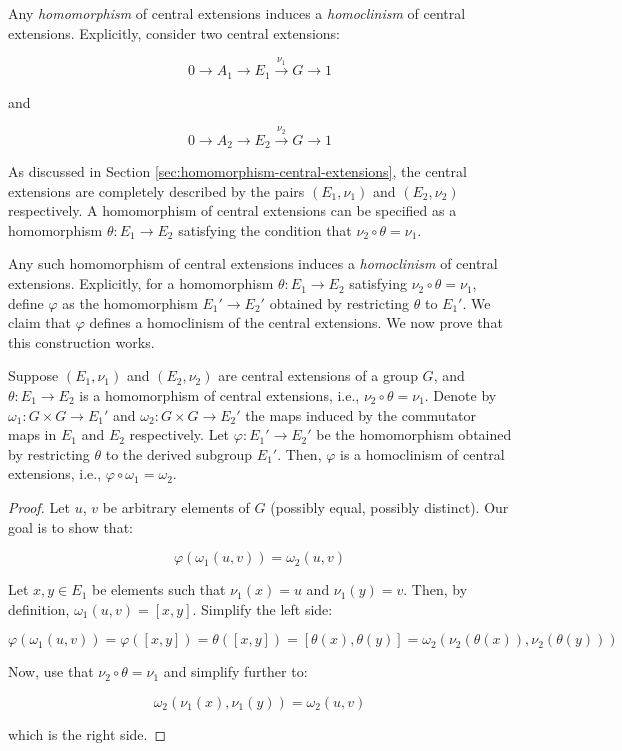 Any {\em homomorphism} of central extensions induces a {\em
  homoclinism} of central extensions. Explicitly, consider two central
extensions:

$$0 \to A_1 \to E_1 \stackrel{\nu_1}{\to} G \to 1$$

and

$$0 \to A_2 \to E_2 \stackrel{\nu_2}{\to} G \to 1$$

As discussed in Section \ref{sec:homomorphism-central-extensions}, the
central extensions are completely described by the pairs $(E_1,\nu_1)$
and $(E_2,\nu_2)$ respectively. A homomorphism of central extensions
can be specified as a homomorphism $\theta:E_1 \to E_2$ satisfying the
condition that $\nu_2 \circ \theta = \nu_1$.

Any such homomorphism of central extensions induces a {\em
  homoclinism} of central extensions. Explicitly, for a homomorphism
$\theta: E_1 \to E_2$ satisfying $\nu_2 \circ \theta = \nu_1$, define
$\varphi$ as the homomorphism $E_1' \to E_2'$ obtained by restricting
$\theta$ to $E_1'$. We claim that $\varphi$ defines a homoclinism of
the central extensions. We now prove that this construction works.

\begin{lemma}\label{lemma:homomorphism-restriction-homoclinism}
  Suppose $(E_1,\nu_1)$ and $(E_2,\nu_2)$ are central extensions of a
  group $G$, and $\theta:E_1 \to E_2$ is a homomorphism of central
  extensions, i.e., $\nu_2 \circ \theta = \nu_1$. Denote by $\omega_1:
  G \times G \to E_1'$ and $\omega_2: G \times G \to E_2'$ the maps
  induced by the commutator maps in $E_1$ and $E_2$ respectively. Let
  $\varphi:E_1' \to E_2'$ be the homomorphism obtained by restricting
  $\theta$ to the derived subgroup $E_1'$. Then, $\varphi$ is a
  homoclinism of central extensions, i.e., $\varphi \circ \omega_1 =
  \omega_2$.
\end{lemma}

\begin{proof}
  Let $u$, $v$ be arbitrary elements of $G$ (possibly equal, possibly
  distinct). Our goal is to show that:

  $$\varphi(\omega_1(u,v)) = \omega_2(u,v)$$

  Let $x, y \in E_1$ be elements such that $\nu_1(x) = u$ and
  $\nu_1(y) = v$. Then, by definition, $\omega_1(u,v) =
  [x,y]$. Simplify the left side:

  $$\varphi(\omega_1(u,v)) = \varphi([x,y]) = \theta([x,y]) = [\theta(x),\theta(y)] = \omega_2(\nu_2(\theta(x)),\nu_2(\theta(y)))$$

  Now, use that $\nu_2 \circ \theta = \nu_1$ and simplify further to:

  $$\omega_2(\nu_1(x),\nu_1(y)) = \omega_2(u,v)$$

  which is the right side.
\end{proof}

